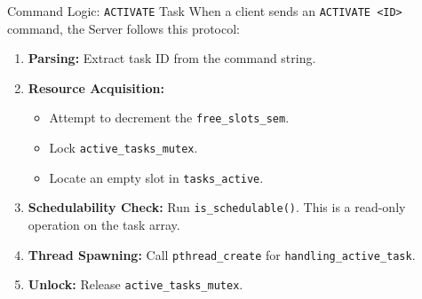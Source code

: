 \begin{frame}{Command Logic: \texttt{ACTIVATE} Task}
    When a client sends an \texttt{ACTIVATE <ID>} command, the Server follows this protocol:
    \begin{enumerate}
        \item \textbf{Parsing:} Extract task ID from the command string.
        \item \textbf{Resource Acquisition:} 
        \begin{itemize}
            \item Attempt to decrement the \texttt{free\_slots\_sem}.
            \item Lock \texttt{active\_tasks\_mutex}.
            \item Locate an empty slot in \texttt{tasks\_active}.
        \end{itemize}
        \item \textbf{Schedulability Check:} Run \texttt{is\_schedulable()}. This is a read-only operation on the task array.
        \item \textbf{Thread Spawning:} Call \texttt{pthread\_create} for \texttt{handling\_active\_task}.
        \item \textbf{Unlock:} Release \texttt{active\_tasks\_mutex}.
    \end{enumerate}
\end{frame}


